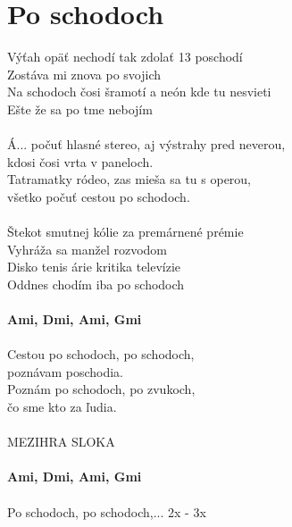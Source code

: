 \section{Po schodoch}
Výťah opäť nechodí tak zdolať 13 poschodí\\
Zostáva mi znova po svojich\\
Na schodoch čosi šramotí a neón kde tu nesvieti\\
Ešte že sa po tme nebojím\\
\\
Á... počuť hlasné stereo, aj výstrahy pred neverou,\\
kdosi čosi vrta v paneloch.\\
Tatramatky ródeo, zas mieša sa tu s operou,\\
všetko počuť cestou po schodoch.\\
\\
Štekot smutnej kólie za premárnené prémie\\
Vyhráža sa manžel rozvodom\\
Disko tenis árie kritika televízie\\
Oddnes chodím iba po schodoch\\
\\
\footnotesize\textbf{Ami, Dmi, Ami, Gmi}\\
\\
\normalsize
Cestou po schodoch, po schodoch,\\
poznávam poschodia.\\
Poznám po schodoch, po zvukoch,\\
čo sme kto za ľudia.\\
\\
MEZIHRA SLOKA\\
\\
\footnotesize\textbf{Ami, Dmi, Ami, Gmi}\\
\\
\normalsize
Po schodoch, po schodoch,... 2x - 3x\\

